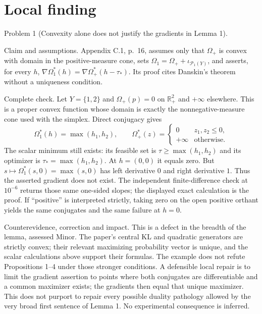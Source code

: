 \documentclass[10pt]{article}
\begin{document}
\section*{Local finding}
Problem 1 (Convexity alone does not justify the gradients in Lemma 1).\par
Claim and assumptions. Appendix C.1, p. 16, assumes only that \(\Omega_+\) is convex with domain in the positive-measure cone, sets \(\Omega_1=\Omega_++\iota_{\mathcal P_1(Y)}\), and asserts, for every \(h\), \(\nabla\Omega_1^*(h)=\nabla\Omega_+^*(h-\tau_*)\). Its proof cites Danskin’s theorem without a uniqueness condition.\par
Complete check. Let \(Y=\{1,2\}\) and \(\Omega_+(p)=0\) on \(\mathbb R_+^2\) and \(+\infty\) elsewhere. This is a proper convex function whose domain is exactly the nonnegative-measure cone used with the simplex. Direct conjugacy gives \[\Omega_1^*(h)=\max(h_1,h_2),\qquad
 \Omega_+^*(z)=\begin{cases}0&z_1,z_2\leq0,\\+\infty&\text{otherwise.}\end{cases}\] The scalar minimum still exists: its feasible set is \(\tau\geq\max(h_1,h_2)\) and its optimizer is \(\tau_* =\max(h_1,h_2)\). At \(h=(0,0)\) it equals zero. But \(s\mapsto\Omega_1^*(s,0)=\max(s,0)\) has left derivative \(0\) and right derivative \(1\). Thus the asserted gradient does not exist. The independent finite-difference check at \(10^{-6}\) returns those same one-sided slopes; the displayed exact calculation is the proof. If “positive” is interpreted strictly, taking zero on the open positive orthant yields the same conjugates and the same failure at \(h=0\).\par
Counterevidence, correction and impact. This is a defect in the breadth of the lemma, assessed Minor. The paper’s central KL and quadratic generators are strictly convex; their relevant maximizing probability vector is unique, and the scalar calculations above support their formulas. The example does not refute Propositions 1–4 under those stronger conditions. A defensible local repair is to limit the gradient assertion to points where both conjugates are differentiable and a common maximizer exists; the gradients then equal that unique maximizer. This does not purport to repair every possible duality pathology allowed by the very broad first sentence of Lemma 1. No experimental consequence is inferred.\par
\end{document}
